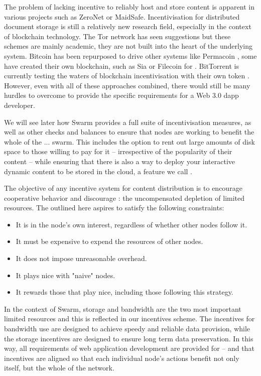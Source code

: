 The problem of lacking incentive to reliably host and store content is apparent in various projects such as ZeroNet or MaidSafe. Incentivisation for distributed document storage is still a relatively new research field, especially in the context of blockchain technology. The Tor network has seen suggestions \cite{jansen2014onions,ghoshetal2014tor} but these schemes are mainly academic, they are not built into the heart of the underlying system. Bitcoin has been repurposed to drive other systems like Permacoin \cite{miller2014permacoin}, some have created their own blockchain, such as Sia \cite{vorick2014sia} or Filecoin \cite{filecoin2014} for . BitTorrent is currently testing the waters of blockchain incentivisation with their own token \cite{tron2018,bittorrent2019}. However, even with all of these approaches combined, there would still be many hurdles to overcome to provide the specific requirements for a Web 3.0 dapp developer.

We will see later how Swarm provides a full suite of incentivisation measures, as well as other checks and balances to ensure that nodes are working to benefit the whole of the ... swarm. This includes the option to rent out large amounts of disk space to those willing to pay for it – irrespective of the popularity of their content – while ensuring that there is also a way to deploy your interactive dynamic content to be stored in the cloud, a feature we call .

The objective of any incentive system for  content distribution is to encourage cooperative behavior and discourage : the uncompensated depletion of limited resources. The  outlined here aspires to satisfy the following constraints:

\begin{itemize}
    \item It is in the node's own interest, regardless of whether other nodes follow it.
    \item It must be expensive to expend the resources of other nodes.
    \item It does not impose unreasonable overhead.
    \item It plays nice with "naive" nodes.
    \item It rewards those that play nice, including those following this strategy.
\end{itemize}

In the context of Swarm, storage and bandwidth are the two most important limited resources and this is reflected in our incentives scheme. The incentives for bandwidth use are designed to achieve speedy and reliable data provision, while the storage incentives are designed to ensure long term data preservation. In this way, all requirements of web application development are provided for – and that incentives are aligned so that each individual node's actions benefit not only itself, but the whole of the network. 


